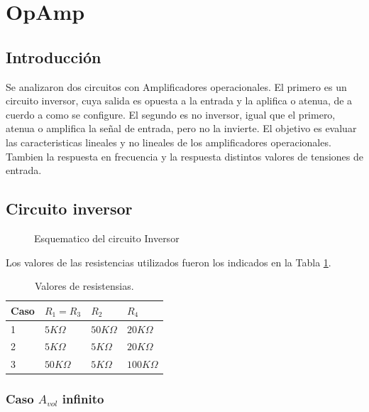\documentclass[../../main.tex]{subfiles}
\begin{document}
\section{OpAmp}
\subsection{Introducci\'on}
Se analizaron dos circuitos con Amplificadores operacionales. El primero es un circuito inversor, cuya salida es opuesta a la entrada y  la aplifica o atenua, de a cuerdo a como se configure. El segundo es no inversor, igual que el primero, atenua o amplifica la señal de entrada, pero no la invierte.
El objetivo es evaluar las caracteristicas lineales y no lineales de los amplificadores operacionales. Tambien la respuesta en frecuencia y la respuesta  distintos valores de tensiones de entrada.


\subsection{Circuito inversor}



\begin{figure}[H]
\centering



\caption{Esquematico del circuito Inversor}
\end{figure}

Los valores de las resistencias utilizados fueron los indicados en la Tabla \ref{tab=vResistencias}.

\begin{table}[h]
\begin{center}
\begin{tabular}{|l|l|l|l|}
\hline
Caso & $R_{1}=R_{3}$ & $R_{2}$ & $R_{4}$\\
\hline \hline
1 & $5 K\Omega $ &  $50 K\Omega $ &  $20 K\Omega $ \\ \hline
2 & $5 K\Omega $ &  $5 K\Omega $ &  $20 K\Omega $ \\ \hline
3 & $50 K\Omega $ &  $5 K\Omega $ &  $100 K\Omega $ \\ \hline
\end{tabular}
\caption{Valores de resistensias.} 
\label{tab=vResistencias}
\end{center}
\end{table}



\subsubsection{Caso $A_{vol}$ infinito}
\end{document}
